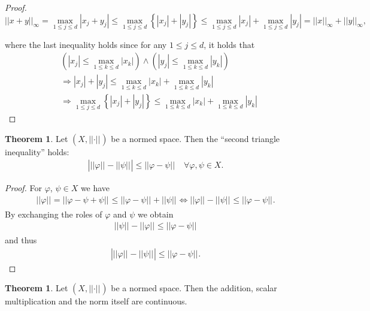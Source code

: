 \documentclass[12pt, a4paper]{article}
\numberwithin{equation}{section}
\theoremstyle{definition}
\theoremstyle{definition}
\newtheorem{theorem}[thm]{Theorem}
\newcommand{\norm}[2]{\left\vert\left\vert #1 \right\vert\right\vert_{#2}}
\newcommand{\abs}[1]{\left\vert #1 \right\vert}
\begin{document}
\begin{proof}
		$$\norm{x + y}{\infty} = \max_{1\leq j\leq d}{\abs{x_j + y_j}} \leq \max_{1\leq j\leq d}\left\{\abs{x_j} + \abs{y_j}\right\} \leq \max_{1\leq j\leq d}\abs{x_j} + \max_{1\leq j\leq d}\abs{y_j} = \norm{x}{\infty} + \norm{y}{\infty},$$
		
		where the last inequality holds since for any $1\leq j \leq d$, it holds that
		\begin{align*}
			&\left(\abs{x_j} \leq \max_{1\leq k\leq d}\abs{x_k}\right) \wedge \left(\abs{y_j} \leq \max_{1\leq k\leq d}\abs{y_k}\right) 
			\\ &\Rightarrow \abs{x_j} + \abs{y_j} \leq \max_{1\leq k\leq d}\abs{x_k} + \max_{1\leq k\leq d}\abs{y_k} 
			\\ &\Rightarrow \max_{1\leq j\leq d}\left\{\abs{x_j} + \abs{y_j}\right\} \leq \max_{1\leq k\leq d}\abs{x_k} + \max_{1\leq k\leq d}\abs{y_k}
		\end{align*}
	\end{proof}
	
		
	\begin{theorem}\label{second-triangle-inequality}
		Let $(X, \norm{\cdot}{})$ be a normed space. Then the \enquote{second triangle inequality} holds: 
			\begin{align}
				\abs{\norm{\varphi}{} - \norm{\psi}{}} \leq \norm{\varphi - \psi}{} \quad \forall \varphi, \psi \in X. 
			\end{align}
	\end{theorem}

	\begin{proof}
		For $\varphi$, $\psi \in X$ we have 
		\begin{align}
			\norm{\varphi}{} = \norm{\varphi - \psi + \psi}{} \leq \norm{\varphi - \psi}{} + \norm{\psi}{} \Leftrightarrow \norm{\varphi}{} - \norm{\psi}{} \leq \norm{\varphi - \psi}{}. 
		\end{align}
		By exchanging the roles of $\varphi$ and $\psi$ we obtain 
		\begin{align}
			\norm{\psi}{} - \norm{\varphi}{} \leq \norm{\varphi - \psi}{}
		\end{align}
		and thus 
		\begin{align}
			\abs{\norm{\varphi}{} - \norm{\psi}{}} \leq \norm{\varphi - \psi}{}. 
		\end{align}
	\end{proof}
	
	\begin{theorem}\label{norms_continuities}
		Let $(X, \norm{\cdot}{})$ be a normed space. Then the addition, scalar multiplication and the norm itself are continuous. 
	\end{theorem}
	
\end{document}
